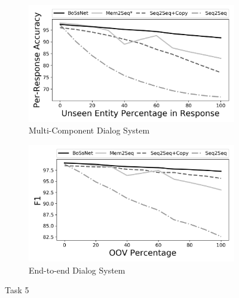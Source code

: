\begin{figure}[!t]
\centering
\begin{subfigure}{0.8\textwidth}
 \includegraphics[width=\linewidth]{assets/graphs/task5_Acc.png}
 \caption{Multi-Component Dialog System}\label{fig:systemfull}
\end{subfigure}

\vspace*{0.5in}

\begin{subfigure}{0.8\textwidth}
 \includegraphics[width=\linewidth]{assets/graphs/task5_F1.png}
 \caption{End-to-end Dialog System}\label{fig:end2end}
\end{subfigure}

\caption{Task 5}
\end{figure}

\clearpage

